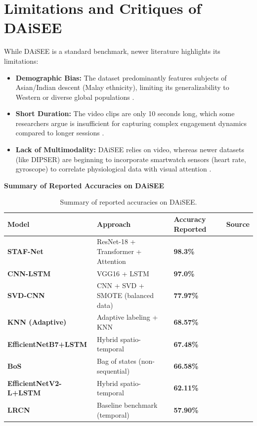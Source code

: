 \section{Limitations and Critiques of DAiSEE}
\label{sec:limitations-and-critiques-of-daisee}

While DAiSEE is a standard benchmark, newer literature highlights its limitations:
\begin{itemize}
  \item{\textbf{Demographic Bias:} The dataset predominantly features subjects of Asian/Indian descent (Malay ethnicity), limiting its generalizability to Western or diverse global populations \cite{MarquezCarpintero2025DIPSERAD}.}
  \item{\textbf{Short Duration:} The video clips are only 10 seconds long, which some researchers argue is insufficient for capturing complex engagement dynamics compared to longer sessions \cite{MarquezCarpintero2025DIPSERAD}.}
  \item{\textbf{Lack of Multimodality:} DAiSEE relies on video, whereas newer datasets (like DIPSER) are beginning to incorporate smartwatch sensors (heart rate, gyroscope) to correlate physiological data with visual attention \cite{MarquezCarpintero2025DIPSERAD}.}
\end{itemize}

\textbf{\large{Summary of Reported Accuracies on DAiSEE}}

\begin{table}[h]
  \centering
  \caption{Summary of reported accuracies on DAiSEE.}
  \label{tab:daisee-accuracies}
  \renewcommand{\arraystretch}{1.25}
  \begin{tabular}{@{}m{4.1cm}m{7.25cm}m{2.0cm}m{1.5cm}@{}}
    \toprule
    \textbf{Model} & \textbf{Approach} & \textbf{Accuracy Reported} & \textbf{Source} \\
    \midrule
    \textbf{STAF-Net} & ResNet-18 + Transformer + Attention & \textbf{98.3\%} & \cite{2025STAFNetAS} \\
    \textbf{CNN-LSTM} & VGG16 + LSTM & \textbf{97.0\%} & \cite{Ismaeel2025DetectingSE} \\
    \textbf{SVD-CNN} & CNN + SVD + SMOTE (balanced data) & \textbf{77.97\%} & \cite{Santoni2023} \\
    \textbf{KNN (Adaptive)} & Adaptive labeling + KNN & \textbf{68.57\%} & \cite{Malekshahi2024AGM} \\
    \textbf{EfficientNetB7+LSTM} & Hybrid spatio-temporal & \textbf{67.48\%} & \cite{Malekshahi2024AGM} \\
    \textbf{BoS} & Bag of states (non-sequential) & \textbf{66.58\%} & \cite{Abedi2023BagOS} \\
    \textbf{EfficientNetV2-L+LSTM} & Hybrid spatio-temporal & \textbf{62.11\%} & \cite{Shiri2024DetectionOS} \\
    \textbf{LRCN} & Baseline benchmark (temporal) & \textbf{57.90\%} & \cite{Gupta2016DAiSEETU} \\
    \bottomrule
  \end{tabular}
\end{table}

